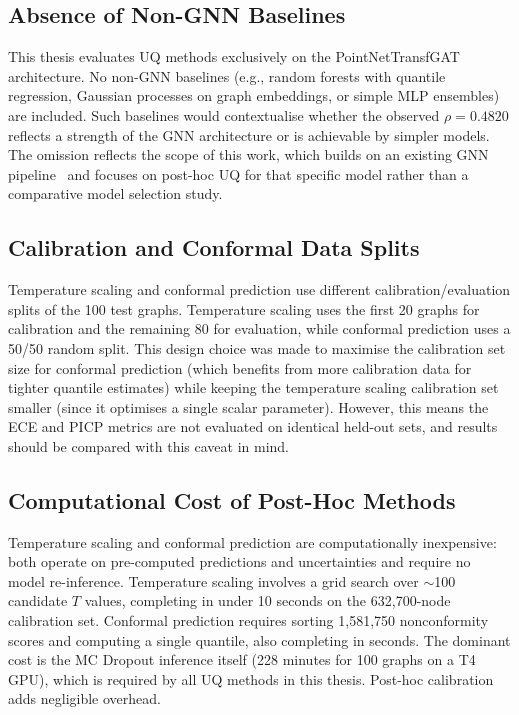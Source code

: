\subsection{Absence of Non-GNN Baselines}

This thesis evaluates UQ methods exclusively on the PointNetTransfGAT architecture. No non-GNN baselines (e.g., random forests with quantile regression, Gaussian processes on graph embeddings, or simple MLP ensembles) are included. Such baselines would contextualise whether the observed $\rho = 0.4820$ reflects a strength of the GNN architecture or is achievable by simpler models. The omission reflects the scope of this work, which builds on an existing GNN pipeline~\cite{natterer2025ml} and focuses on post-hoc UQ for that specific model rather than a comparative model selection study.

\subsection{Calibration and Conformal Data Splits}

Temperature scaling and conformal prediction use different calibration/evaluation splits of the 100 test graphs. Temperature scaling uses the first 20 graphs for calibration and the remaining 80 for evaluation, while conformal prediction uses a 50/50 random split. This design choice was made to maximise the calibration set size for conformal prediction (which benefits from more calibration data for tighter quantile estimates) while keeping the temperature scaling calibration set smaller (since it optimises a single scalar parameter). However, this means the ECE and PICP metrics are not evaluated on identical held-out sets, and results should be compared with this caveat in mind.

\subsection{Computational Cost of Post-Hoc Methods}

Temperature scaling and conformal prediction are computationally inexpensive: both operate on pre-computed predictions and uncertainties and require no model re-inference. Temperature scaling involves a grid search over $\sim$100 candidate $T$ values, completing in under 10 seconds on the 632,700-node calibration set. Conformal prediction requires sorting 1,581,750 nonconformity scores and computing a single quantile, also completing in seconds. The dominant cost is the MC Dropout inference itself (228 minutes for 100 graphs on a T4 GPU), which is required by all UQ methods in this thesis. Post-hoc calibration adds negligible overhead.

